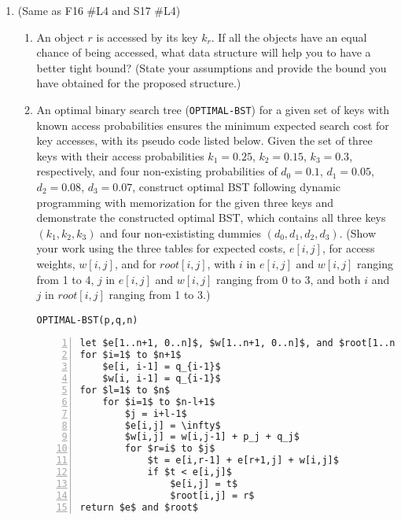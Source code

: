 \begin{enumerate}
	\item (Same as F16 \#L4 and S17 \#L4)
	\begin{enumerate}
		\item An object $r$ is accessed by its key $k_r$.  If all the objects have an equal chance of being accessed, what data structure will help you to have a better tight bound?  (State your assumptions and provide the bound you have obtained for the proposed structure.)
		\item An optimal binary search tree (\verb|OPTIMAL-BST|) for a given set of keys with known access probabilities ensures the minimum expected search cost for key accesses, with its pseudo code listed below.  Given the set of three keys with their access probabilities $k_1 = 0.25$, $k_2 = 0.15$, $k_3 = 0.3$, respectively, and four non-existing probabilities of $d_0 = 0.1$, $d_1 = 0.05$, $d_2 = 0.08$, $d_3 = 0.07$, construct optimal BST following dynamic programming with memorization for the given three keys and demonstrate the constructed optimal BST, which contains all three keys $(k_1, k_2, k_3)$ and four non-exististing dummies $(d_0, d_1, d_2, d_3)$.  (Show your work using the three tables for expected costs, $e[i,j]$, for access weights, $w[i,j]$, and for $root[i,j]$, with $i$ in $e[i,j]$ and $w[i,j]$ ranging from 1 to 4, $j$ in $e[i,j]$ and $w[i,j]$ ranging from 0 to 3, and both $i$ and $j$ in $root[i,j]$ ranging from 1 to 3.)
\

\verb|OPTIMAL-BST(p,q,n)|

\begin{lstlisting}[mathescape=true, numbers=left]
let $e[1..n+1, 0..n]$, $w[1..n+1, 0..n]$, and $root[1..n, 1..n]$ be new tables.
for $i=1$ to $n+1$
	$e[i, i-1] = q_{i-1}$
	$w[i, i-1] = q_{i-1}$
for $l=1$ to $n$
	for $i=1$ to $n-l+1$
		$j = i+l-1$
		$e[i,j] = \infty$
		$w[i,j] = w[i,j-1] + p_j + q_j$
		for $r=i$ to $j$
			$t = e[i,r-1] + e[r+1,j] + w[i,j]$
			if $t < e[i,j]$
				$e[i,j] = t$
				$root[i,j] = r$
return $e$ and $root$
\end{lstlisting}

	\end{enumerate}
	
	
\end{enumerate}

